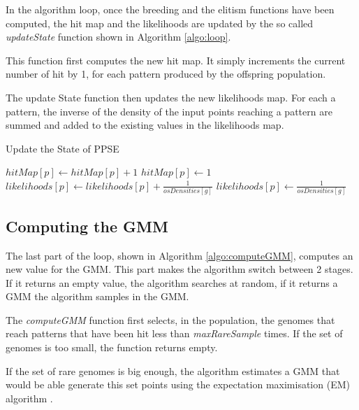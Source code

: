 \documentclass[10pt,letterpaper]{article}
\theoremstyle{definition}
\theoremstyle{remark}
\begin{document}
In the algorithm loop, once the breeding and the elitism functions have been computed, the hit map and the likelihoods are updated by the so called \textit{updateState} function shown in Algorithm \ref{algo:loop}. 

This function first computes the new hit map. 
It simply increments the current number of hit by 1, for each pattern produced by the offspring population.

The update State function then updates the new likelihoods map. 
For each a pattern, the inverse of the density of the input points reaching a pattern are summed and added to the existing values in the likelihoods map.

\begin{algorithm}
    \caption{Update the State of PPSE}
    \label{algo:loop}
    \begin{algorithmic}[1]
          \State $hitMap[p] \gets hitMap[p] + 1$
          \Else
          \State $hitMap[p] \gets 1$
          \EndIf
          \Statex          
          \State $likelihoods[p] \gets likelihoods[p] + \frac{1}{osDensities[g]}$
          \Else 
          \State $likelihoods[p] \gets \frac{1}{osDensities[g]}$
          \EndIf
        \EndFor
        \State {}
    \EndFunction

    \end{algorithmic}
\end{algorithm}

\subsection*{Computing the GMM}\label{sec:computeGMM}

The last part of the loop, shown in Algorithm \ref{algo:computeGMM}, computes an new value for the GMM. 
This part makes the algorithm switch between 2 stages. 
If it returns an empty value, the algorithm searches at random, if it returns a GMM the algorithm samples in the GMM.

The \textit{computeGMM} function first selects, in the population, the genomes that reach patterns that have been hit less than \textit{maxRareSample} times. 
If the set of genomes is too small, the function returns empty.

If the set of rare genomes is big enough, the algorithm estimates a GMM that would be able generate this set points using the expectation maximisation (EM) algorithm \cite{dempster1977em}. 
\end{document}

